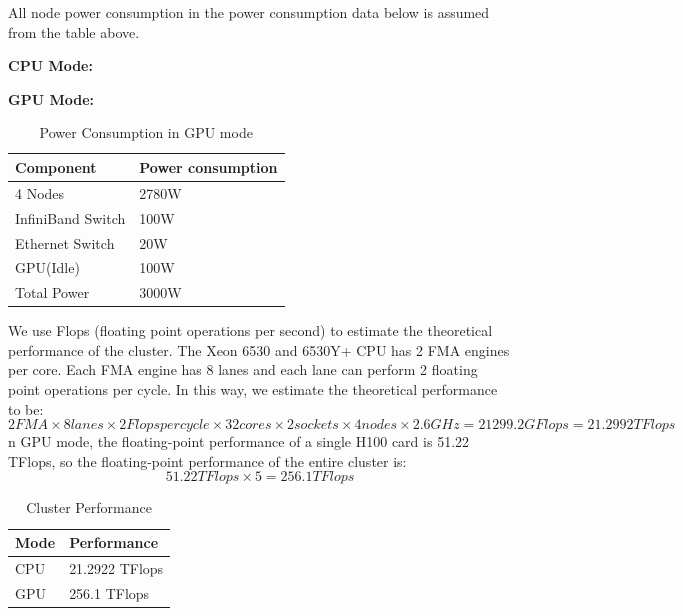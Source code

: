 \documentclass[a4paper,12pt]{article}
\begin{document}
All node power consumption in the power consumption data below is assumed from the table above.

\textbf{CPU Mode:}

\textbf{GPU Mode:}
\begin{table}[H]
\centering
\caption{Power Consumption in GPU mode}
\begin{tabular}{|l|l|}
\hline
Component & Power consumption \\
\hline
4 Nodes & 2780W \\
\hline
InfiniBand Switch & 100W \\
\hline
Ethernet Switch & 20W \\
\hline
GPU(Idle) & 100W \\
\hline
Total Power & 3000W \\
\hline
\end{tabular}
\end{table}

We use Flops (floating point operations per second) to estimate the theoretical performance of the cluster.
The Xeon 6530 and 6530Y+ CPU has 2 FMA engines per core. Each FMA engine has 8 lanes and each lane can perform 2 floating point operations per cycle. In this way, we estimate the theoretical performance to be:
\begin{equation*}
2FMA \times 8lanes \times 2Flopspercycle \times 32cores \times 2sockets \times 4nodes \times 2.6GHz = 21299.2 GFlops = 21.2992 TFlops
\end{equation*}
n GPU mode, the floating-point performance of a single H100 card is 51.22 TFlops, so the floating-point performance of the entire cluster is:
\begin{equation*}
51.22TFlops \times 5 = 256.1 TFlops
\end{equation*}

\begin{table}[H]
\centering
\caption{Cluster Performance}
\begin{tabular}{|l|l|}
\hline
Mode & Performance \\
\hline
CPU & 21.2922 TFlops \\
\hline
GPU & 256.1 TFlops \\
\hline
\end{tabular}
\end{table}
\end{document}
